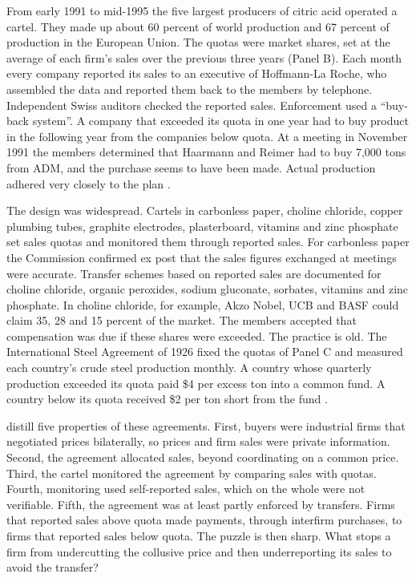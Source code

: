 From early 1991 to mid-1995 the five largest producers of citric acid operated a cartel. They made up about
60 percent of world production and 67 percent of production in the European Union. The quotas were market shares,
set at the average of each firm's sales over the previous three years (Panel B). Each month every company reported
its sales to an executive of Hoffmann-La Roche, who assembled the data and reported them back to the members by
telephone. Independent Swiss auditors checked the reported sales. Enforcement used a ``buy-back system''. A company
that exceeded its quota in one year had to buy product in the following year from the companies below quota. At
a meeting in November 1991 the members determined that Haarmann and Reimer had to buy 7,000 tons from ADM, and the
purchase seems to have been made. Actual production adhered very closely to the plan
\citep[p.~2426]{HarringtonSkrzypacz2011}.

The design was widespread. Cartels in carbonless paper, choline chloride, copper plumbing tubes, graphite
electrodes, plasterboard, vitamins and zinc phosphate set sales quotas and monitored them through reported sales.
For carbonless paper the Commission confirmed ex post that the sales figures exchanged at meetings were accurate.
Transfer schemes based on reported sales are documented for choline chloride, organic peroxides, sodium gluconate,
sorbates, vitamins and zinc phosphate. In choline chloride, for example, Akzo Nobel, UCB and BASF could claim
35, 28 and 15 percent of the market. The members accepted that compensation was due if these shares were
exceeded. The practice is old. The International Steel Agreement of 1926 fixed the quotas of Panel C and measured
each country's crude steel production monthly. A country whose quarterly production exceeded its quota paid \$4
per excess ton into a common fund. A country below its quota received \$2 per ton short from the fund
\citep[pp.~2427--2428]{HarringtonSkrzypacz2011}.

\citet[p.~2427]{HarringtonSkrzypacz2011} distill five properties of these agreements. First, buyers were industrial
firms that negotiated prices bilaterally, so prices and firm sales were private information. Second, the agreement
allocated sales, beyond coordinating on a common price. Third, the cartel monitored the agreement by comparing
sales with quotas. Fourth, monitoring used self-reported sales, which on the whole were not verifiable. Fifth,
the agreement was at least partly enforced by transfers. Firms that reported sales above quota made payments,
through interfirm purchases, to firms that reported sales below quota. The puzzle is then sharp. What stops a firm
from undercutting the collusive price and then underreporting its sales to avoid the transfer?

